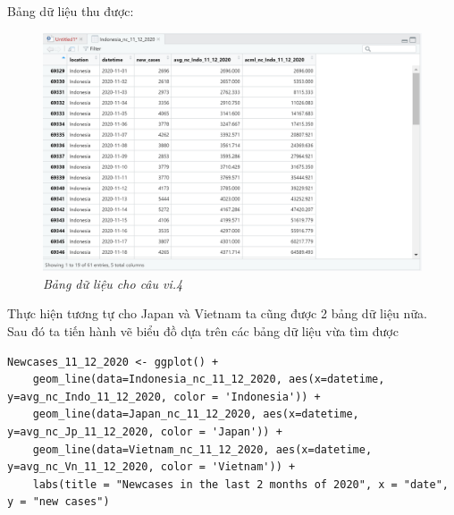 \documentclass[a4paper]{article}
\theoremstyle{definition}
\begin{document}
\begin{enumerate}[1)]
	Bảng dữ liệu thu được:\\[8pt]
	\begin{figure}[H]
	    \begin{center}
            \includegraphics[scale=0.6]{vi/bang_indo_11_12_2020}
	    \end{center}
	    \vspace{+3mm}\caption{\it Bảng dữ liệu cho câu vi.4}
	\end{figure}
	
	
	Thực hiện tương tự cho Japan và Vietnam ta cũng được 2 bảng dữ liệu nữa.\\[8pt]
	Sau đó ta tiến hành vẽ biểu đồ dựa trên các bảng dữ liệu vừa tìm được\\
	
	\begin{lstlisting}
Newcases_11_12_2020 <- ggplot() +
	geom_line(data=Indonesia_nc_11_12_2020, aes(x=datetime, y=avg_nc_Indo_11_12_2020, color = 'Indonesia')) +
	geom_line(data=Japan_nc_11_12_2020, aes(x=datetime, y=avg_nc_Jp_11_12_2020, color = 'Japan')) +
	geom_line(data=Vietnam_nc_11_12_2020, aes(x=datetime, y=avg_nc_Vn_11_12_2020, color = 'Vietnam')) +
	labs(title = "Newcases in the last 2 months of 2020", x = "date", y = "new cases")
	\end{lstlisting}


\end{enumerate}
\end{document}
